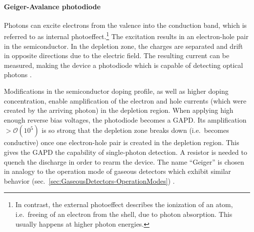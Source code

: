 \paragraph{Geiger-Avalance photodiode}
Photons can excite electrons from the valence into the conduction band, which is referred to as internal photoeffect.\footnote{In contrast, the external photoeffect describes the ionization of an atom, i.e.\ freeing of an electron from the shell, due to photon absorption. This usually happens at higher photon energies.} The excitation results in an electron-hole pair in the semiconductor. In the depletion zone, the charges are separated and drift in opposite directions due to the electric field. The resulting current can be measured, making the device a photodiode which is capable of detecting optical photons \cite{Book-KolanoskiWermes}.
\par Modifications in the semiconductor doping profile, as well as higher doping concentration, enable amplification of the electron and hole currents (which were created by the arriving photon) in the depletion region. When applying high enough reverse bias voltages, the photodiode becomes a \acf{GAPD}. Its amplification $>\mathcal{O}(10^{5})$ is so strong that the depletion zone breaks down (i.e.\ becomes conductive) once one electron-hole pair is created in the depletion region. This gives the \ac{GAPD} the capability of single-photon detection. A resistor is needed to quench the discharge in order to rearm the device. The name \enquote{Geiger} is chosen in analogy to the operation mode of gaseous detectors which exhibit similar behavior (sec.\ \ref{sec:GaseousDetectors-OperationModes}) \cite{Book-KolanoskiWermes}.
